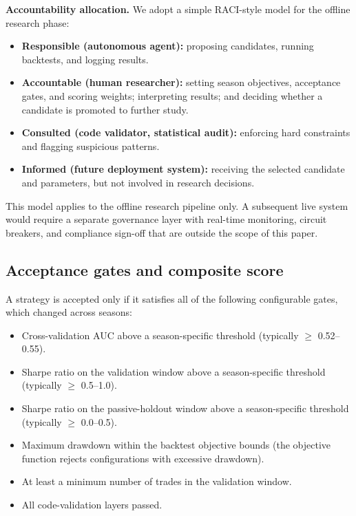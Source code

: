 \documentclass[11pt,a4paper]{article}
\begin{document}
\textbf{Accountability allocation.} We adopt a simple RACI-style model for the offline research phase:

\begin{itemize}
\item
  \textbf{Responsible (autonomous agent):} proposing candidates, running backtests, and logging results.
\item
  \textbf{Accountable (human researcher):} setting season objectives, acceptance gates, and scoring weights; interpreting results; and deciding whether a candidate is promoted to further study.
\item
  \textbf{Consulted (code validator, statistical audit):} enforcing hard constraints and flagging suspicious patterns.
\item
  \textbf{Informed (future deployment system):} receiving the selected candidate and parameters, but not involved in research decisions.
\end{itemize}

This model applies to the offline research pipeline only. A subsequent live system would require a separate governance layer with real-time monitoring, circuit breakers, and compliance sign-off that are outside the scope of this paper.

\subsection{Acceptance gates and composite score}\label{acceptance-gates-and-composite-score}

A strategy is accepted only if it satisfies all of the following configurable gates, which changed across seasons:

\begin{itemize}
\item
  Cross-validation AUC above a season-specific threshold (typically $\geq$ 0.52--0.55).
\item
  Sharpe ratio on the validation window above a season-specific threshold (typically $\geq$ 0.5--1.0).
\item
  Sharpe ratio on the passive-holdout window above a season-specific threshold (typically $\geq$ 0.0--0.5).
\item
  Maximum drawdown within the backtest objective bounds (the objective function rejects configurations with excessive drawdown).
\item
  At least a minimum number of trades in the validation window.
\item
  All code-validation layers passed.
\end{itemize}
\end{document}
